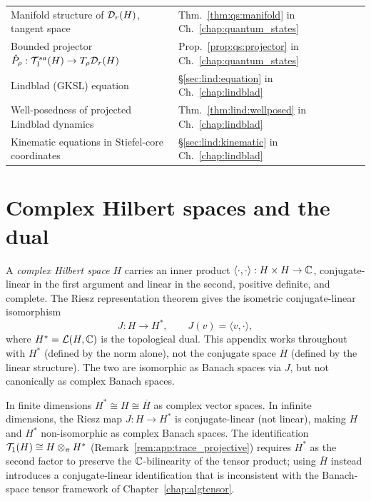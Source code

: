 \begin{center}
\begin{tabular}{@{}p{7.5cm}l@{}}
Manifold structure of $\mathcal{D}_{r}(H)$, tangent space
    & Thm.~\ref{thm:qs:manifold}
      in Ch.~\ref{chap:quantum_states} \\
Bounded projector $\hat{P}_\rho: \mathcal{T}_{1}^{sa}(H) \to T_\rho\mathcal{D}_{r}(H)$
    & Prop.~\ref{prop:qs:projector}
      in Ch.~\ref{chap:quantum_states} \\
Lindblad (GKSL) equation
    & \S\ref{sec:lind:equation}
      in Ch.~\ref{chap:lindblad} \\
Well-posedness of projected Lindblad dynamics
    & Thm.~\ref{thm:lind:wellposed}
      in Ch.~\ref{chap:lindblad} \\
Kinematic equations in Stiefel-core coordinates
    & \S\ref{sec:lind:kinematic}
      in Ch.~\ref{chap:lindblad} \\
\bottomrule
\end{tabular}
\end{center}

\section{Complex Hilbert spaces and the dual}
\label{app:quantum:hilbert}

A \emph{complex Hilbert space} $H$ carries an inner product
$\langle \cdot, \cdot\rangle: H \times H \to \mathbb{C}$, conjugate-linear
in the first argument and linear in the second, positive definite, and
complete. The Riesz representation theorem gives the isometric
conjugate-linear isomorphism
\begin{equation}
\label{eq:app:riesz}
    J: H \longrightarrow H^*,
    \qquad J(v) = \langle v, \cdot\rangle,
\end{equation}
where $H^* = \mathcal{L}(H, \mathbb{C})$ is the topological dual. This appendix works
throughout with $H^*$ (defined by the norm alone), not the conjugate
space $\overline{H}$ (defined by the linear structure). The two are
isomorphic as Banach spaces via $J$, but not canonically as complex
Banach spaces.

\begin{remark}
\label{rem:app:dual_vs_conjugate}
In finite dimensions $H^* \cong H \cong \overline{H}$ as complex vector
spaces. In infinite dimensions, the Riesz map $J: H \to H^*$ is
conjugate-linear (not linear), making $H$ and $H^*$ non-isomorphic
as complex Banach spaces. The identification $\mathcal{T}_{1}(H) \cong H
\otimes_\pi H^*$ (Remark~\ref{rem:app:trace_projective}) requires
$H^*$ as the second factor to preserve the $\mathbb{C}$-bilinearity of the
tensor product; using $\overline{H}$ instead introduces a
conjugate-linear identification that is inconsistent with the
Banach-space tensor framework of Chapter~\ref{chap:algtensor}.
\end{remark}

